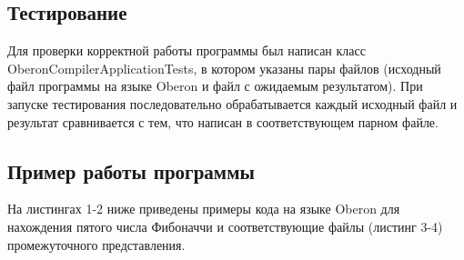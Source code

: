\subsection{Тестирование}
Для проверки корректной работы программы был написан класс OberonCompilerApplicationTests, в котором указаны пары файлов (исходный файл программы на языке Oberon и файл с ожидаемым результатом). При запуске тестирования последовательно обрабатывается каждый исходный файл и результат сравнивается с тем, что написан в соответствующем парном файле.\\

\subsection{Пример работы программы}
На листингах 1-2 ниже приведены примеры кода на языке Oberon для нахождения пятого числа Фибоначчи и соответствующие файлы (листинг 3-4) промежуточного представления. 







\label{lst:fib-array-ll}